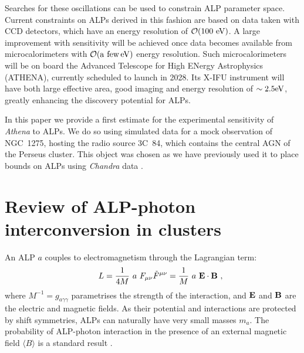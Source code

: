 \documentclass[fleqn,usenatbib,useAMS]{mnras}
\begin{document}
Searches for these oscillations can be used to constrain ALP parameter space.
Current constraints on ALPs derived in this fashion \citep{1304.0989, Berg:2016ese, Marsh:2017yvc,Conlon:2017qcw} are based on data taken with CCD detectors, which have an energy resolution of $\mathcal{O}(100~\rm{eV})$. A large improvement with sensitivity will be achieved once data becomes available from microcalorimeters with $\mathcal{O}({\rm a~few} \, \rm{eV})$ energy resolution.
Such microcalorimeters will be on board the Advanced Telescope for High ENergy Astrophysics (ATHENA), currently scheduled to launch in 2028.
Its X-IFU instrument will have both large effective area, good imaging and energy resolution of $\sim 2.5 \rm{eV}$, greatly enhancing the discovery potential for ALPs.

In this paper we provide a first estimate for the experimental sensitivity of {\it Athena} to ALPs. We do so using simulated data for a mock observation of NGC~1275, hosting the radio source 3C~84, which contains the central AGN of the Perseus cluster.
This object was chosen as we have previously used it to place bounds on ALPs using {\it Chandra} data \citep{Berg:2016ese}.

\section{Review of ALP-photon interconversion in clusters}
\label{alps}
An ALP $a$ couples to electromagnetism through the Lagrangian term:
\begin{equation}
\label{ALPphoton}
\qquad L = \frac{1}{4 M}~a~F_{\mu \nu} \tilde{F}^{\mu \nu} =  \frac{1}{M}~a~{\bf E} \cdot {\bf B}~,
\end{equation}
where ${M^{-1} = g_{a\gamma\gamma}}$ parametrises the strength of the interaction,
and ${\bf E}$ and ${\bf B}$ are the electric and magnetic fields.
As their potential and interactions are protected by shift symmetries, ALPs can naturally have very small masses $m_a$. The probability of ALP-photon interaction in the presence of an external magnetic field $\langle B \rangle$ is a standard result \citep{Sikivie:1983ip, Raffelt:1987im}. 
\end{document}
